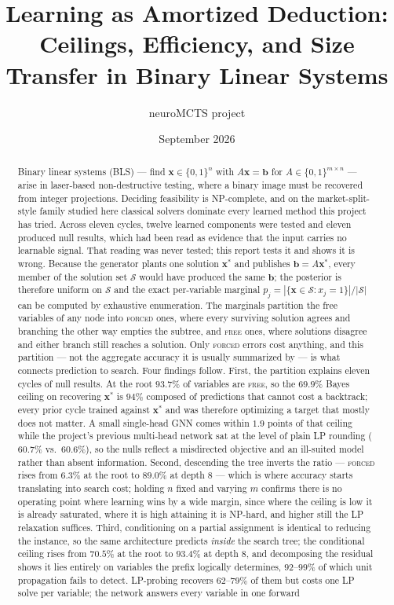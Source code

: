 \documentclass[12pt]{article}
\title{Learning as Amortized Deduction:\\
Ceilings, Efficiency, and Size Transfer in Binary Linear Systems}
\author{neuroMCTS project}
\date{September 2026}
\begin{document}
\maketitle

\begin{abstract}
Binary linear systems (BLS) --- find $\mathbf{x}\in\{0,1\}^n$ with $A\mathbf{x}=\mathbf{b}$ for $A\in\{0,1\}^{m\times n}$ --- arise in laser-based non-destructive testing, where a binary image must be recovered from integer projections. Deciding feasibility is NP-complete, and on the market-split-style family studied here classical solvers dominate every learned method this project has tried. Across eleven cycles, twelve learned components were tested and eleven produced null results, which had been read as evidence that the input carries no learnable signal. That reading was never tested; this report tests it and shows it is wrong. Because the generator plants one solution $\mathbf{x}^*$ and publishes $\mathbf{b}=A\mathbf{x}^*$, every member of the solution set $\mathcal{S}$ would have produced the same $\mathbf{b}$; the posterior is therefore uniform on $\mathcal{S}$ and the exact per-variable marginal $p_j=|\{\mathbf{x}\in\mathcal{S}:x_j=1\}|/|\mathcal{S}|$ can be computed by exhaustive enumeration. The marginals partition the free variables of any node into \textsc{forced} ones, where every surviving solution agrees and branching the other way empties the subtree, and \textsc{free} ones, where solutions disagree and either branch still reaches a solution. Only \textsc{forced} errors cost anything, and this partition --- not the aggregate accuracy it is usually summarized by --- is what connects prediction to search. Four findings follow. First, the partition explains eleven cycles of null results. At the root $93.7\%$ of variables are \textsc{free}, so the $69.9\%$ Bayes ceiling on recovering $\mathbf{x}^\ast$ is $94\%$ composed of predictions that cannot cost a backtrack; every prior cycle trained against $\mathbf{x}^\ast$ and was therefore optimizing a target that mostly does not matter. A small single-head GNN comes within $1.9$ points of that ceiling while the project's previous multi-head network sat at the level of plain LP rounding ($60.7\%$ vs.\ $60.6\%$), so the nulls reflect a misdirected objective and an ill-suited model rather than absent information. Second, descending the tree inverts the ratio --- \textsc{forced} rises from $6.3\%$ at the root to $89.0\%$ at depth $8$ --- which is where accuracy starts translating into search cost; holding $n$ fixed and varying $m$ confirms there is no operating point where learning wins by a wide margin, since where the ceiling is low it is already saturated, where it is high attaining it is NP-hard, and higher still the LP relaxation suffices. Third, conditioning on a partial assignment is identical to reducing the instance, so the same architecture predicts \emph{inside} the search tree; the conditional ceiling rises from $70.5\%$ at the root to $93.4\%$ at depth $8$, and decomposing the residual shows it lies entirely on variables the prefix logically determines, $92$--$99\%$ of which unit propagation fails to detect. LP-probing recovers $62$--$79\%$ of them but costs one LP solve per variable; the network answers every variable in one forward 
\end{abstract}
\end{document}
